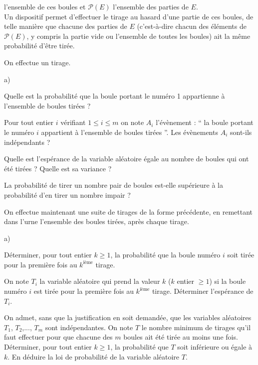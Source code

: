 \documentclass[11pt]{article}%
\begin{document}
l'ensemble de ces boules et $\mathcal{P}(E)$ l'ensemble des parties de
$E$.\\
Un dispositif permet d'effectuer le tirage au hasard d'une partie de
ces boules, de telle manière que chacune des parties de $E$
(c'est-à-dire chacun des éléments de $\mathcal{P}(E)$, y compris la
partie vide ou l'ensemble de toutes les boules) ait la même probabilité
d'être tirée.
 \setlength{\itemsep}{4mm}
\item
On effectue un tirage.
\begin{noliste}{a)}
 \setlength{\itemsep}{2mm}
\item
Quelle est la probabilité que la boule portant le numéro 1 appartienne
à l'ensemble de boules tirées ?
\item
Pour tout entier $i$ vérifiant $1\leq i \leq m$ on note $A_{i}$
l'évènement : `` la boule portant le numéro $i$ appartient à l'ensemble
de boules tirées ''. Les évènements $A_{i}$ sont-ils indépendants ?
\item
Quelle est l'espérance de la variable aléatoire égale au nombre de
boules qui ont été tirées ? Quelle est sa variance ?
\item
La probabilité de tirer un nombre pair de boules est-elle supérieure à
la probabilité d'en tirer un nombre impair ?
\end{noliste}
On effectue maintenant une suite de tirages de la forme précédente, en
remettant dans l'urne l'ensemble des boules tirées, après chaque
tirage.
\begin{noliste}{a)}
 \setlength{\itemsep}{2mm}
\item
Déterminer, pour tout entier $k\geq 1$, la probabilité que la boule
numéro $i$ soit tirée pour la première fois au $k^\textrm{ième}$
tirage.
\item
On note $T_{i}$ la variable aléatoire qui prend la valeur $k$ ($k$
entier $\geq 1$) si la boule numéro $i$ est tirée pour la première fois
au $k^\textrm{ième}$ tirage. Déterminer l'espérance de $T_{i}$.
\item
On admet, sans que la justification en soit demandée, que les variables
aléatoires $T_{1}$, $T_{2}$,..., $T_{m}$ sont indépendantes. On note
$T$ le nombre minimum de tirages qu'il faut effectuer pour que chacune
des $m$ boules ait été tirée au moins une fois. Déterminer, pour tout
entier $k\geq 1$, la probabilité que $T$ soit inférieure ou égale à
$k$. En déduire la loi de probabilité de la variable aléatoire $T$.
\end{noliste}
\end{document}
